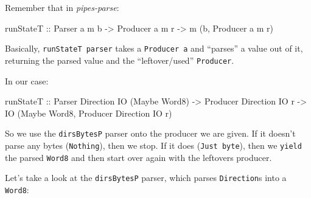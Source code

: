 \documentclass[]{article}
\newenvironment{Shaded}{}{}
\newcommand{\DataTypeTok}[1]{\textcolor[rgb]{0.56,0.13,0.00}{#1}}
\newcommand{\NormalTok}[1]{#1}
\newcommand{\OtherTok}[1]{\textcolor[rgb]{0.00,0.44,0.13}{#1}}
\begin{document}
Remember that in \emph{pipes-parse}:

\begin{Shaded}
\begin{Highlighting}[]
\OtherTok{runStateT ::} \DataTypeTok{Parser}\NormalTok{ a m b }\OtherTok{{-}\textgreater{}} \DataTypeTok{Producer}\NormalTok{ a m r }\OtherTok{{-}\textgreater{}}\NormalTok{ m (b, }\DataTypeTok{Producer}\NormalTok{ a m r)}
\end{Highlighting}
\end{Shaded}

Basically, \texttt{runStateT\ parser} takes a \texttt{Producer\ a} and
``parses'' a value out of it, returning the parsed value and the
``leftover/used'' \texttt{Producer}.

In our case:

\begin{Shaded}
\begin{Highlighting}[]
\OtherTok{runStateT ::} \DataTypeTok{Parser}   \DataTypeTok{Direction} \DataTypeTok{IO}\NormalTok{ (}\DataTypeTok{Maybe} \DataTypeTok{Word8}\NormalTok{)}
          \OtherTok{{-}\textgreater{}} \DataTypeTok{Producer} \DataTypeTok{Direction} \DataTypeTok{IO}\NormalTok{ r}
          \OtherTok{{-}\textgreater{}} \DataTypeTok{IO}\NormalTok{ (}\DataTypeTok{Maybe} \DataTypeTok{Word8}\NormalTok{, }\DataTypeTok{Producer} \DataTypeTok{Direction} \DataTypeTok{IO}\NormalTok{ r)}
\end{Highlighting}
\end{Shaded}

So we use the \texttt{dirsBytesP} parser onto the producer we are given. If it
doesn't parse any bytes (\texttt{Nothing}), then we stop. If it does
(\texttt{Just\ byte}), then we \texttt{yield} the parsed \texttt{Word8} and then
start over again with the leftovers producer.

Let's take a look at the \texttt{dirsBytesP} parser, which parses
\texttt{Direction}s into a \texttt{Word8}:
\end{document}
